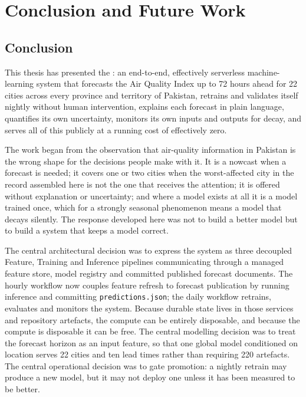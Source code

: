 \chapter{Conclusion and Future Work}
\label{ch:conclusion}

\section{Conclusion}
This thesis has presented the \projname: an end-to-end, effectively serverless
machine-learning system that forecasts the Air Quality Index up to 72 hours ahead
for 22 cities across every province and territory of Pakistan, retrains and
validates itself nightly without human intervention, explains each forecast in
plain language, quantifies its own uncertainty, monitors its own inputs and
outputs for decay, and serves all of this publicly at a running cost of
effectively zero.

The work began from the observation that air-quality information in Pakistan is
the wrong shape for the decisions people make with it. It is a nowcast when a
forecast is needed; it covers one or two cities when the worst-affected city in
the record assembled here is not the one that receives the attention; it is
offered without explanation or uncertainty; and where a model exists at all it is
a model trained once, which for a strongly seasonal phenomenon means a model that
decays silently. The response developed here was not to build a better model but
to build a system that keeps a model correct.

The central architectural decision was to express the system as three decoupled
Feature, Training and Inference pipelines communicating through a managed
feature store, model registry and committed published forecast documents. The
hourly workflow now couples feature refresh to forecast publication by running
inference and committing \texttt{predictions.json}; the daily workflow retrains,
evaluates and monitors the system. Because durable state lives in those services
and repository artefacts, the compute can be entirely disposable, and because the
compute is disposable it can be free. The central modelling decision was to treat the
forecast horizon as an input feature, so that one global model conditioned on
location serves 22 cities and ten lead times rather than requiring 220 artefacts.
The central operational decision was to gate promotion: a nightly retrain may
produce a new model, but it may not deploy one unless it has been measured to be
better.

